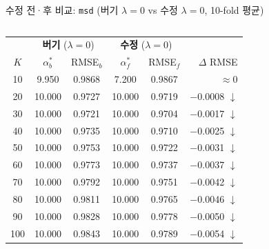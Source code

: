 \documentclass[aspectratio=169,10pt]{beamer}
\begin{document}
\begin{frame}[shrink=20]{수정 전·후 비교: \texttt{msd} \textnormal{\small(버기 $\lambda=0$ vs 수정 $\lambda=0$, 10-fold 평균)}}
	\begin{columns}[T]
		\begin{center}
		\renewcommand{\arraystretch}{1.15}
		\small
		\begin{tabular}{c|cc|cc|r}
			\toprule
			& \multicolumn{2}{c|}{\textbf{버기} ($\lambda=0$)} & \multicolumn{2}{c|}{\textbf{수정} ($\lambda=0$)} & \\
			$K$ & $\alpha^*_b$ & RMSE$_b$ & $\alpha^*_f$ & RMSE$_f$ & $\Delta$ RMSE \\
			\midrule
			\rowcolor{hilight!40}
			10  &  9.950 & 0.9868 &  7.200 & 0.9867 & $\approx$0 \\
			20  & 10.000 & 0.9727 & 10.000 & 0.9719 & \textcolor{testgreen}{$-$0.0008 $\downarrow$} \\
			30  & 10.000 & 0.9721 & 10.000 & 0.9704 & \textcolor{testgreen}{$-$0.0017 $\downarrow$} \\
			40  & 10.000 & 0.9735 & 10.000 & 0.9710 & \textcolor{testgreen}{$-$0.0025 $\downarrow$} \\
			50  & 10.000 & 0.9753 & 10.000 & 0.9722 & \textcolor{testgreen}{$-$0.0031 $\downarrow$} \\
			60  & 10.000 & 0.9773 & 10.000 & 0.9737 & \textcolor{testgreen}{$-$0.0037 $\downarrow$} \\
			70  & 10.000 & 0.9792 & 10.000 & 0.9751 & \textcolor{testgreen}{$-$0.0042 $\downarrow$} \\
			80  & 10.000 & 0.9811 & 10.000 & 0.9765 & \textcolor{testgreen}{$-$0.0046 $\downarrow$} \\
			90  & 10.000 & 0.9828 & 10.000 & 0.9778 & \textcolor{testgreen}{$-$0.0050 $\downarrow$} \\
			100 & 10.000 & 0.9843 & 10.000 & 0.9789 & \textcolor{testgreen}{$-$0.0054 $\downarrow$} \\
			\bottomrule
		\end{tabular}
		\end{center}


\end{columns}
\end{frame}
\end{document}
